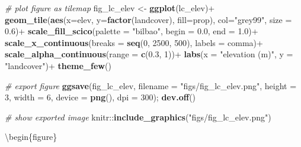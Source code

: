 \documentclass[]{article}
\newenvironment{Shaded}{}{}
\newcommand{\CommentTok}[1]{\textcolor[rgb]{0.38,0.63,0.69}{\textit{#1}}}
\newcommand{\DataTypeTok}[1]{\textcolor[rgb]{0.56,0.13,0.00}{#1}}
\newcommand{\DecValTok}[1]{\textcolor[rgb]{0.25,0.63,0.44}{#1}}
\newcommand{\FloatTok}[1]{\textcolor[rgb]{0.25,0.63,0.44}{#1}}
\newcommand{\KeywordTok}[1]{\textcolor[rgb]{0.00,0.44,0.13}{\textbf{#1}}}
\newcommand{\NormalTok}[1]{#1}
\newcommand{\OperatorTok}[1]{\textcolor[rgb]{0.40,0.40,0.40}{#1}}
\newcommand{\StringTok}[1]{\textcolor[rgb]{0.25,0.44,0.63}{#1}}
\begin{document}
\begin{Shaded}
\begin{Highlighting}[]
\CommentTok{# plot figure as tilemap}
\NormalTok{fig_lc_elev <-}\StringTok{ }\KeywordTok{ggplot}\NormalTok{(lc_elev)}\OperatorTok{+}
\StringTok{  }\KeywordTok{geom_tile}\NormalTok{(}\KeywordTok{aes}\NormalTok{(}\DataTypeTok{x=}\NormalTok{elev, }\DataTypeTok{y=}\KeywordTok{factor}\NormalTok{(landcover), }
                \DataTypeTok{fill=}\NormalTok{prop), }
            \DataTypeTok{col=}\StringTok{"grey99"}\NormalTok{, }\DataTypeTok{size =} \FloatTok{0.6}\NormalTok{)}\OperatorTok{+}
\StringTok{  }\KeywordTok{scale_fill_scico}\NormalTok{(}\DataTypeTok{palette =} \StringTok{"bilbao"}\NormalTok{, }\DataTypeTok{begin =} \FloatTok{0.0}\NormalTok{, }\DataTypeTok{end =} \FloatTok{1.0}\NormalTok{)}\OperatorTok{+}
\StringTok{  }\KeywordTok{scale_x_continuous}\NormalTok{(}\DataTypeTok{breaks =} \KeywordTok{seq}\NormalTok{(}\DecValTok{0}\NormalTok{, }\DecValTok{2500}\NormalTok{, }\DecValTok{500}\NormalTok{), }\DataTypeTok{labels =}\NormalTok{ comma)}\OperatorTok{+}
\StringTok{  }\KeywordTok{scale_alpha_continuous}\NormalTok{(}\DataTypeTok{range =} \KeywordTok{c}\NormalTok{(}\FloatTok{0.3}\NormalTok{, }\DecValTok{1}\NormalTok{))}\OperatorTok{+}
\StringTok{  }\KeywordTok{labs}\NormalTok{(}\DataTypeTok{x =} \StringTok{"elevation (m)"}\NormalTok{, }
       \DataTypeTok{y =} \StringTok{"landcover"}\NormalTok{)}\OperatorTok{+}
\StringTok{  }\KeywordTok{theme_few}\NormalTok{()}

\CommentTok{# export figure}
\KeywordTok{ggsave}\NormalTok{(fig_lc_elev, }\DataTypeTok{filename =} \StringTok{"figs/fig_lc_elev.png"}\NormalTok{, }
       \DataTypeTok{height =} \DecValTok{3}\NormalTok{, }\DataTypeTok{width =} \DecValTok{6}\NormalTok{, }\DataTypeTok{device =} \KeywordTok{png}\NormalTok{(), }\DataTypeTok{dpi =} \DecValTok{300}\NormalTok{); }\KeywordTok{dev.off}\NormalTok{()}
\end{Highlighting}
\end{Shaded}

\begin{Shaded}
\begin{Highlighting}[]

\CommentTok{# show exported image}
\NormalTok{knitr}\OperatorTok{::}\KeywordTok{include_graphics}\NormalTok{(}\StringTok{"figs/fig_lc_elev.png"}\NormalTok{)}
\end{Highlighting}
\end{Shaded}

\textbackslash{}begin\{figure\}
\end{document}
